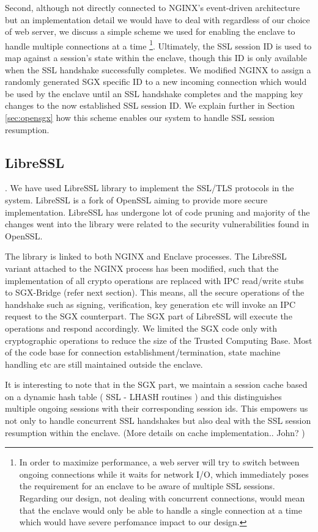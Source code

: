 \documentclass[../main.tex]{subfiles}
\begin{document}
Second, although not directly connected to NGINX's event-driven architecture
but an implementation detail we would have to deal with regardless of our
choice of web server, we discuss a simple scheme we used for enabling the
enclave to handle multiple connections at a time \footnote{In order to maximize
performance, a web server will try to switch between ongoing connections while
it waits for network I/O, which immediately poses the requirement for an
enclave to be aware of multiple SSL sessions. Regarding our design, not dealing
with concurrent connections, would mean that the enclave would only be able to
handle a single connection at a time which would have severe perfomance impact
to our design.}. Ultimately, the SSL session ID is used to map against a
session's state within the enclave, though this ID is only available when the
SSL handshake successfully completes. We modified NGINX to assign a randomly
generated SGX specific ID to a new incoming connection which would be used by
the enclave until an SSL handshake completes and the mapping key changes to the
now established SSL session ID. We explain further in Section \ref{sec:opensgx}
how this scheme enables our system to handle SSL session resumption.

\subsection{LibreSSL}.
We have used LibreSSL library to implement the SSL/TLS protocols in the system. LibreSSL is a fork of OpenSSL aiming to provide more secure implementation. LibreSSL has undergone lot of code pruning and majority of the changes went into the library were related to the security vulnerabilities found in OpenSSL. 

The library is linked to both NGINX and Enclave processes. The LibreSSL variant attached to the NGINX process has been modified, such that  the implementation of all crypto operations are replaced with IPC read/write stubs to SGX-Bridge (refer next section).  This means,  all the secure operations of the handshake such as signing, verification, key generation etc will invoke an IPC request to the SGX counterpart. The SGX part of LibreSSL will  execute the operations and respond accordingly. We limited the SGX  code only with cryptographic operations to reduce the size of the Trusted Computing Base. Most of the code base for connection establishment/termination, state machine handling etc are still maintained outside the enclave. 

It is interesting to note that in the SGX part, we maintain a session cache based on a dynamic hash table ( SSL - LHASH routines ) and this distinguishes multiple ongoing sessions with their corresponding session ids. This empowers us not only to handle concurrent SSL handshakes but also deal with the SSL session resumption within the enclave. 
 (More details on cache implementation.. John? )
\end{document}
